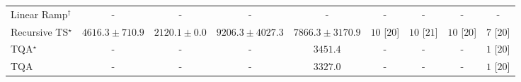 \begin{tabular}{l|cccc|cccc|}
Linear Ramp$^\dagger$ & {\cellcolor[HTML]{000000}} \color[HTML]{F1F1F1} {\cellcolor{white}} \color{black} - & {\cellcolor[HTML]{000000}} \color[HTML]{F1F1F1} {\cellcolor{white}} \color{black} - & {\cellcolor[HTML]{000000}} \color[HTML]{F1F1F1} {\cellcolor{white}} \color{black} - & {\cellcolor[HTML]{000000}} \color[HTML]{F1F1F1} {\cellcolor{white}} \color{black} - & {\cellcolor[HTML]{000000}} \color[HTML]{F1F1F1} {\cellcolor{white}} \color{black} - & {\cellcolor[HTML]{000000}} \color[HTML]{F1F1F1} {\cellcolor{white}} \color{black} - & {\cellcolor[HTML]{000000}} \color[HTML]{F1F1F1} {\cellcolor{white}} \color{black} - & {\cellcolor[HTML]{000000}} \color[HTML]{F1F1F1} {\cellcolor{white}} \color{black} - \\
Recursive TS$^\star$ & {\cellcolor[HTML]{9EBAD9}} \color[HTML]{000000} $4616.3\pm 710.9$ & {\cellcolor[HTML]{F5EEF6}} \color[HTML]{000000} $2120.1\pm 0.0$ & {\cellcolor[HTML]{023858}} \color[HTML]{F1F1F1} $9206.3\pm 4027.3$ & {\cellcolor[HTML]{04639B}} \color[HTML]{F1F1F1} $7866.3\pm 3170.9$ & {\cellcolor[HTML]{49006A}} \color[HTML]{F1F1F1} $10$ [$20$] & {\cellcolor[HTML]{49006A}} \color[HTML]{F1F1F1} $10$ [$21$] & {\cellcolor[HTML]{49006A}} \color[HTML]{F1F1F1} $10$ [$20$] & {\cellcolor[HTML]{CD238F}} \color[HTML]{F1F1F1} $7$ [$20$] \\
TQA$^\star$ & {\cellcolor[HTML]{000000}} \color[HTML]{F1F1F1} {\cellcolor{white}} \color{black} - & {\cellcolor[HTML]{000000}} \color[HTML]{F1F1F1} {\cellcolor{white}} \color{black} - & {\cellcolor[HTML]{000000}} \color[HTML]{F1F1F1} {\cellcolor{white}} \color{black} - & {\cellcolor[HTML]{D2D2E7}} \color[HTML]{000000} $3451.4$ & {\cellcolor[HTML]{000000}} \color[HTML]{F1F1F1} {\cellcolor{white}} \color{black} - & {\cellcolor[HTML]{000000}} \color[HTML]{F1F1F1} {\cellcolor{white}} \color{black} - & {\cellcolor[HTML]{000000}} \color[HTML]{F1F1F1} {\cellcolor{white}} \color{black} - & {\cellcolor[HTML]{FFF7F3}} \color[HTML]{000000} $1$ [$20$] \\
TQA & {\cellcolor[HTML]{000000}} \color[HTML]{F1F1F1} {\cellcolor{white}} \color{black} - & {\cellcolor[HTML]{000000}} \color[HTML]{F1F1F1} {\cellcolor{white}} \color{black} - & {\cellcolor[HTML]{000000}} \color[HTML]{F1F1F1} {\cellcolor{white}} \color{black} - & {\cellcolor[HTML]{D5D5E8}} \color[HTML]{000000} $3327.0$ & {\cellcolor[HTML]{000000}} \color[HTML]{F1F1F1} {\cellcolor{white}} \color{black} - & {\cellcolor[HTML]{000000}} \color[HTML]{F1F1F1} {\cellcolor{white}} \color{black} - & {\cellcolor[HTML]{000000}} \color[HTML]{F1F1F1} {\cellcolor{white}} \color{black} - & {\cellcolor[HTML]{FFF7F3}} \color[HTML]{000000} $1$ [$20$] \\

\end{tabular}
